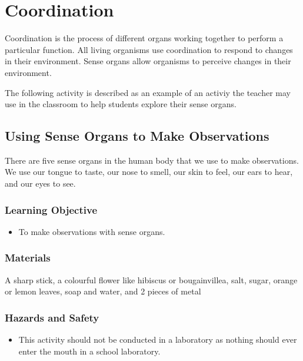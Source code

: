 \section{Coordination}
Coordination is the process of different organs working together to perform a particular function. All living organisms use coordination to respond to changes in their environment. Sense organs allow organisms to perceive changes in their environment.

The following activity is described as an example of an activiy the teacher may use in the classroom to help students explore their sense organs.

\subsection{Using Sense Organs to Make Observations}
There are five sense organs in the human body that we use to make observations. We use our tongue to taste, our nose to smell, our skin to feel, our ears to hear, and our eyes to see.

\subsubsection*{Learning Objective}
\begin{itemize}
\item{To make observations with sense organs.}
\end{itemize}

\subsubsection*{Materials}
A sharp stick, a colourful flower like hibiscus or bougainvillea, salt, sugar, orange or lemon leaves, soap and water, and 2 pieces of metal

\subsubsection*{Hazards and Safety}
\begin{itemize}
\item{This activity should not be conducted in a laboratory as nothing should ever enter the mouth in a school laboratory.}
\end{itemize}

